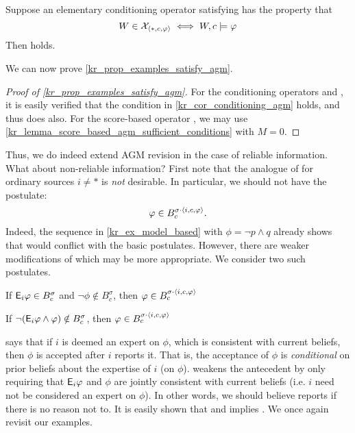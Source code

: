 \begin{corollary}
    \label{kr_cor_conditioning_agm}
    Suppose an elementary conditioning operator satisfying \kconj{} has the
    property that
    \[
        W \in \mathcal{X}_{\langle {\ast, c, \varphi} \rangle} \iff W, c \models \varphi
    \]
    Then \agm{} holds.
\end{corollary}

We can now prove \cref{kr_prop_examples_satisfy_agm}.

\begin{proof}[Proof of \cref{kr_prop_examples_satisfy_agm}]
    For the conditioning operators \varbasedcond{} and \partbasedcond{}, it is
    easily verified that the condition in \cref{kr_cor_conditioning_agm} holds,
    and thus \agm{} does also.
    For the score-based operator \scorebasedop{}, we may use
    \cref{kr_lemma_score_based_agm_sufficient_conditions} with $M = 0 $.
\end{proof}

Thus, we do indeed extend AGM revision in the case of reliable information.
What about non-reliable information? First note that the analogue of \agm{} for
ordinary sources $i \ne \ast$ is \emph{not} desirable. In particular, we
should not have the  postulate:
\[
    \varphi \in B^{\sigma \cdot \langle {i, c, \varphi} \rangle}_c.
\]
Indeed, the sequence in \cref{kr_ex_model_based} with $\phi = \neg p
\land q$ already shows that  would conflict with the
basic postulates.
%
However, there are weaker modifications of  which may be
more appropriate. We consider two such postulates.

\begin{axiomlist}
\begin{axiom}[\condsucc{}]
    If $\mathsf{E}_i\varphi \in B^\sigma_c$ and $\neg\phi \notin B^\sigma_c$, then $\varphi
    \in B^{\sigma \cdot \langle {i, c, \varphi} \rangle}_c$
\end{axiom}
\begin{axiom}[\strongcondsucc{}]
    If $\neg(\mathsf{E}_i\varphi \land \varphi) \notin B^\sigma_c$, then $\varphi \in B^{\sigma
    \cdot \langle {i, c, \varphi} \rangle}_c$
\end{axiom}
\end{axiomlist}

\condsucc{} says that if $i$ is deemed an expert on $\phi$, which is consistent
with current beliefs, then $\phi$ is accepted after $i$ reports it. That is,
the acceptance of $\phi$ is \emph{conditional} on prior beliefs about the expertise of
$i$ (on $\phi$). \strongcondsucc{} weakens the antecedent by only requiring
that $\mathsf{E}_i\varphi$ and $\phi$ are jointly consistent with current beliefs (i.e.
$i$ need not be considered an expert on $\phi$). In other words, we should
believe reports if there is no reason not to. It is easily shown that
\closure{} and \strongcondsucc{} implies \condsucc{}.
%
We once again revisit our examples.

